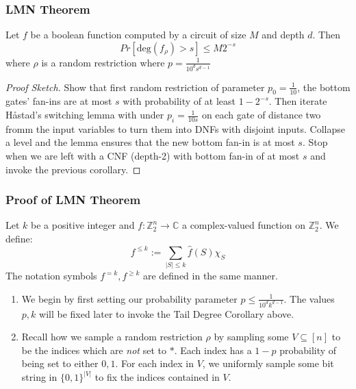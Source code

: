 \documentclass{beamer}
\begin{document}
\begin{frame}
  \frametitle{LMN Theorem}
  \begin{corollary} \label{fouriertail}
    Let $f$ be a boolean function computed by a circuit of size $M$ and depth $d$. Then
    $$ Pr[\text{deg}(f_{\rho}) > s] \leq M2^{-s} $$
    where $\rho$ is a random restriction where $p = \frac{1}{10^ds^{d-1}}$
  \end{corollary}
  \pause
  \begin{proof}[Proof Sketch]
    Show that first random restriction of parameter $p_0 = \frac{1}{10}$, the bottom gates' fan-ins are at most $s$ with probability of at least $1 - 2^{-s}$. Then iterate H\aa stad's switching lemma with under $p_i = \frac{1}{10s}$ on each gate of distance two fromm the input variables to turn them into DNFs with disjoint inputs. Collapse a level and the lemma ensures that the new bottom fan-in is at most $s$. Stop when we are left with a CNF (depth-2) with bottom fan-in of at most $s$ and invoke the previous corollary.
  \end{proof}
\end{frame}

\begin{frame}
  \frametitle{Proof of LMN Theorem}
  \begin{definition}
    Let $k$ be a positive integer and $f:\mathbb{Z}_2^n \rightarrow \mathbb{C}$ a complex-valued function on $\mathbb{Z}_2^n$. We define: \newline
    $$f^{\leq k} := \sum_{|S| \leq k} \hat{f}(S)\chi_{S} $$
    The notation symbols $f^{=k},f^{\geq k}$ are defined in the same manner.
  \end{definition}
  \pause
  \begin{enumerate}
    \item We begin by first setting our probability parameter $p \leq \frac{1}{10^dk^{d-1}}$. The values $p, k$ will be fixed later to invoke the Tail Degree Corollary above.
    \pause
    \item
    Recall how we sample a random restriction $\rho$ by sampling some $V \subseteq [n]$ to be the indices which are \emph{not} set to $*$. Each index has a $1-p$ probability of being set to either $0,1$. For each index in $V$, we uniformly sample some bit string in $\{0,1\}^{|V|}$ to fix the indices contained in $V$.

  \end{enumerate}
\end{frame}
\end{document}
